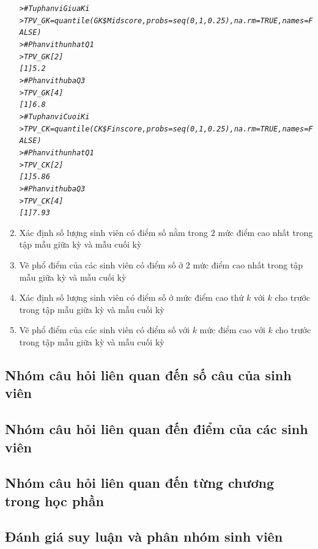 \documentclass[a4paper]{article}
\theoremstyle{definition}
\begin{document}
\begin{enumerate}[1.]
\begin{mdframed}[backgroundcolor=magenta!10]
\begin{alltt}
}
    \end{alltt}
    \end{mdframed}
    \begin{mdframed}[backgroundcolor=magenta!10]
    \begin{alltt}
    \textit{
> #Tu phan vi Giua Ki
> TPV_GK = quantile(GK\$Midscore, probs=seq(0,1,0.25), na.rm=TRUE, names=FALSE)
> #Phan vi thu nhat Q1
> TPV_GK[2]
[1] 5.2
> #Phan vi thu ba Q3
> TPV_GK[4]
[1] 6.8
> #Tu phan vi Cuoi Ki
> TPV_CK = quantile(CK\$Finscore, probs=seq(0,1,0.25), na.rm=TRUE, names=FALSE)
> #Phan vi thu nhat Q1
> TPV_CK[2]
[1] 5.86
> #Phan vi thu ba Q3
> TPV_CK[4]
[1] 7.93
}
    \end{alltt}
    \end{mdframed}
    

\item {Xác định số lượng sinh viên có điểm số nằm trong 2 mức điểm cao nhất trong tập mẫu giữa kỳ và mẫu cuối kỳ}
\item {Vẽ phổ điểm của các sinh viên có điểm số ở 2 mức điểm cao nhất trong tập mẫu giữa kỳ và mẫu cuối kỳ}
\item {Xác định số lượng sinh viên có điểm số ở mức điểm cao thứ $k$ với $k$ cho trước trong tập mẫu giữa kỳ và mẫu cuối kỳ}
\item {Vẽ phổ điểm của các sinh viên có điểm số với $k$ mức điểm cao  với $k$ cho trước trong tập mẫu giữa kỳ và mẫu cuối kỳ}
\end{enumerate}


\subsection{Nhóm câu hỏi liên quan đến số câu của sinh viên}
\subsection{Nhóm câu hỏi liên quan đến điểm của các sinh viên}
\subsection{Nhóm câu hỏi liên quan đến từng chương trong học phần}
\subsection{Đánh giá suy luận và phân nhóm sinh viên}
\end{document}
